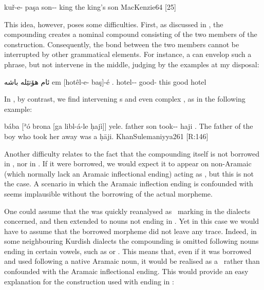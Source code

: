 {kuř-e- paşa}
{son-\ez- king}
{the king's son}
{MacKenzie}{64 {[25]}}

This idea, however, poses some difficulties. First, as discussed in , the compounding \ez* creates a nominal compound consisting of the two members of the construction. Consequently, the bond between the two members  cannot be interrupted by other grammatical elements. For instance, a \dem* can envelop such a phrase, but not intervene in the middle, judging by the examples at my disposal:

{ئام هۆتێلە باشە}
{em [hotêl-e- baş]-é}
{\dem.\near{} hotel-\ez- good-\dem}
{this good hotel}
{\citep[11]{ThackstonSorani}}

\largerpage
In \JSul, by contrast, we find intervening \dem*s and even complex \secns, as in the following example:

{bába [ʾó\cb{} brona [ga\cb{} libl-á-le ḥajì]] \cb{}yele.}
	{father \dem\cb{} son \rel\cb{} took-\fem-\masc{} haji \cb{}\cop.\pst}
{The father of the boy who took her away was a ḥāji.}
{KhanSulemaniyya}{261 {[R:146]}}\antipar 

\newpage 

Another difficulty relates to the fact that the compounding \ez* itself is not borrowed in \JSul, nor in \JSan. If it were borrowed, we would expect it to appear on non-Aramaic  (which normally lack an Aramaic inflectional ending) acting as \prims, but this is not the case. A scenario in which the Aramaic inflection ending is confounded with \ez* seems implausible without the borrowing of the actual morpheme. 



One could assume that the \ez* was quickly reanalysed as \zero\ marking in the   dialects concerned, and then extended to nouns not ending in . Yet  in this case we would have to assume that the borrowed morpheme did not leave any trace. Indeed, in some neighbouring Kurdish dialects the compounding \ez* is omitted following nouns ending in certain vowels, such as \phonetic[a] or \phonetic[e] \citep[64]{MacKenzie}. This means that, even if it was borrowed and used following a native Aramaic noun, it would be realised as a \zero\ rather than confounded with the Aramaic inflectional ending.  This would provide an easy explanation for the  construction used with \pl* \prims ending in :

